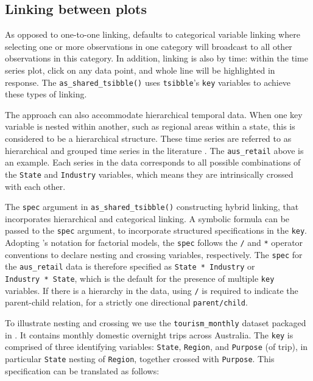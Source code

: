 \hypertarget{linking-between-plots}{%
\subsection{Linking between plots}\label{linking-between-plots}}

As opposed to one-to-one linking,  defaults to
categorical variable linking where selecting one or more observations in
one category will broadcast to all other observations in this category.
In addition, linking is also by time: within the time series plot, click
on any data point, and whole line will be highlighted in response. The
\texttt{as\_shared\_tsibble()} uses \texttt{tsibble}'s \texttt{key}
variables to achieve these types of linking.

The approach can also accommodate hierarchical temporal data. When one
key variable is nested within another, such as regional areas within a
state, this is considered to be a hierarchical structure. These time
series are referred to as hierarchical and grouped time series in the
literature \citep{fpp}. The \texttt{aus\_retail} above is an example.
Each series in the data corresponds to all possible combinations of the
\texttt{State} and \texttt{Industry} variables, which means they are
intrinsically crossed with each other.

The \texttt{spec} argument in \texttt{as\_shared\_tsibble()}
constructing hybrid linking, that incorporates hierarchical and
categorical linking. A symbolic formula can be passed to the
\texttt{spec} argument, to incorporate structured specifications in the
\texttt{key}. Adopting \citet{Wilkinson1973}'s notation for factorial
models, the \texttt{spec} follows the \texttt{/} and \texttt{*} operator
conventions to declare nesting and crossing variables, respectively. The
\texttt{spec} for the \texttt{aus\_retail} data is therefore specified
as \texttt{State\ *\ Industry} or \texttt{Industry\ *\ State}, which is
the default for the presence of multiple \texttt{key} variables. If
there is a hierarchy in the data, using \texttt{/} is required to
indicate the parent-child relation, for a strictly one directional
\texttt{parent/child}.

To illustrate nesting and crossing we use the \texttt{tourism\_monthly}
dataset \citep{tourism} packaged in . It contains
monthly domestic overnight trips across Australia. The \texttt{key} is
comprised of three identifying variables: \texttt{State},
\texttt{Region}, and \texttt{Purpose} (of trip), in particular
\texttt{State} nesting of \texttt{Region}, together crossed with
\texttt{Purpose}. This specification can be translated as follows:


